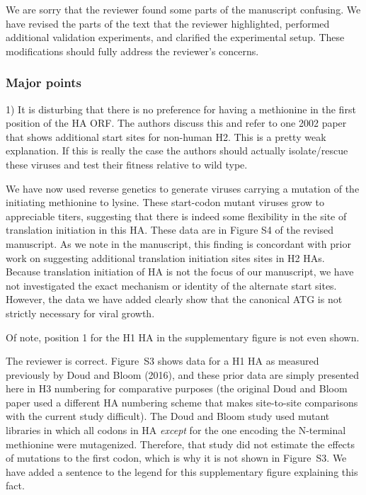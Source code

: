 \documentclass[11pt, oneside]{article}   	%
\newcommand{\response}[1]{{\color{black}#1}}
\begin{document}
\response{We are sorry that the reviewer found some parts of the manuscript confusing.
We have revised the parts of the text that the reviewer highlighted, performed additional validation experiments, and clarified the experimental setup.
These modifications should fully address the reviewer's concerns.}

\subsubsection*{Major points} 

1) It is disturbing that there is no preference for having a methionine in the first position of the HA ORF. The authors discuss this and refer to one 2002 paper that shows additional start sites for non-human H2. This is a pretty weak explanation. If this is really the case the authors should actually isolate/rescue these viruses and test their fitness relative to wild type. 

\response{
We have now used reverse genetics to generate viruses carrying a mutation of the initiating methionine to lysine.
These start-codon mutant viruses grow to appreciable titers, suggesting that there is indeed some flexibility in the site of translation initiation in this HA.
These data are in Figure S4 of the revised manuscript.
As we note in the manuscript, this finding is concordant with prior work on suggesting additional translation initiation sites sites in H2 HAs.
Because translation initiation of HA is not the focus of our manuscript, we have not investigated the exact mechanism or identity of the alternate start sites.
However, the data we have added clearly show that the canonical ATG is not strictly necessary for viral growth.
}

Of note, position 1 for the H1 HA in the supplementary figure is not even shown. 

\response{
The reviewer is correct. 
Figure~S3 shows data for a H1 HA as measured previously by Doud and Bloom (2016), and these prior data are simply presented here in H3 numbering for comparative purposes (the original Doud and Bloom paper used a different HA numbering scheme that makes site-to-site comparisons with the current study difficult). 
The Doud and Bloom study used mutant libraries in which all codons in HA \emph{except} for the one encoding the N-terminal methionine were mutagenized.
Therefore, that study did not estimate the effects of mutations to the first codon, which is why it is not shown in Figure~S3.
We have added a sentence to the legend for this supplementary figure explaining this fact.
}
\end{document}
